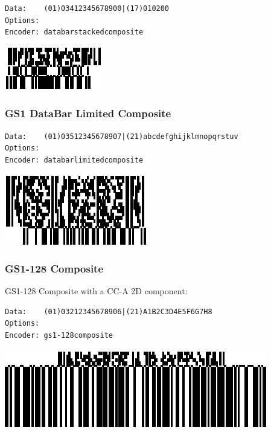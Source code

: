 \begin{verbatim}
Data:    (01)03412345678900|(17)010200
Options: 
Encoder: databarstackedcomposite
\end{verbatim}

\includegraphics{images/databarstackedcomposite-1.eps}

\hypertarget{gs1-databar-limited-composite}{%
\subsubsection{GS1 DataBar Limited
Composite}\label{gs1-databar-limited-composite}}

\begin{verbatim}
Data:    (01)03512345678907|(21)abcdefghijklmnopqrstuv
Options: 
Encoder: databarlimitedcomposite
\end{verbatim}

\includegraphics{images/databarlimitedcomposite-1.eps}

\hypertarget{gs1-128-composite}{%
\subsubsection{GS1-128 Composite}\label{gs1-128-composite}}

GS1-128 Composite with a CC-A 2D component:

\begin{verbatim}
Data:    (01)03212345678906|(21)A1B2C3D4E5F6G7H8
Options: 
Encoder: gs1-128composite
\end{verbatim}

\includegraphics{images/ean128composite-1.eps}

